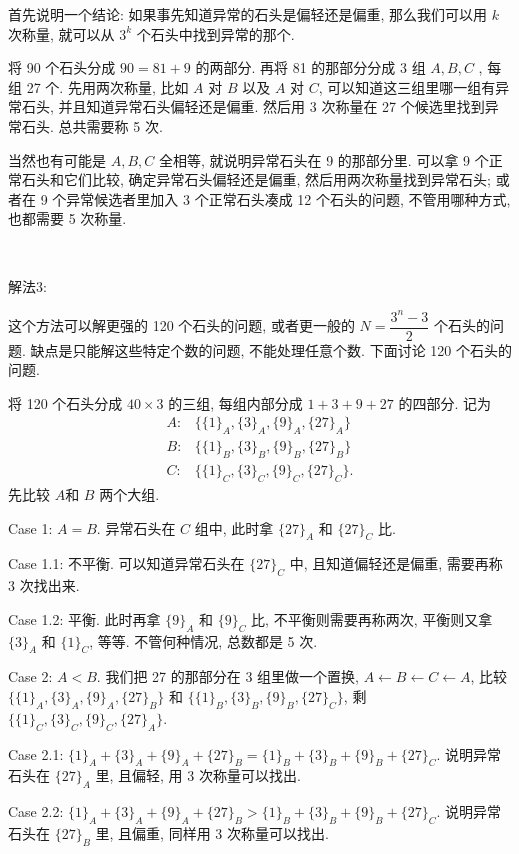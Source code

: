 首先说明一个结论: 如果事先知道异常的石头是偏轻还是偏重, 那么我们可以用 $k$ 次称量, 就可以从 $3^k$ 个石头中找到异常的那个.

将 90 个石头分成 $ 90 = 81 + 9 $ 的两部分. 再将 81 的那部分分成 3 组 $ A,B,C$ , 每组 27 个. 先用两次称量, 比如 $A$ 对 $B$ 以及 $A$ 对 $C$, 可以知道这三组里哪一组有异常石头, 并且知道异常石头偏轻还是偏重. 然后用 3 次称量在 27 个候选里找到异常石头. 总共需要称 5 次.

当然也有可能是 $ A, B, C $ 全相等, 就说明异常石头在 9 的那部分里. 可以拿 9 个正常石头和它们比较, 确定异常石头偏轻还是偏重, 然后用两次称量找到异常石头; 或者在 9 个异常候选者里加入 3 个正常石头凑成 12 个石头的问题, 不管用哪种方式, 也都需要 5 次称量.

~

\noindent 解法3:

这个方法可以解更强的 120 个石头的问题, 或者更一般的 $N = \dfrac{3^n - 3}{2}$ 个石头的问题. 缺点是只能解这些特定个数的问题, 不能处理任意个数. 下面讨论 120 个石头的问题.

将 120 个石头分成 $ 40\times 3 $ 的三组, 每组内部分成 $ 1 + 3 + 9 + 27 $ 的四部分. 记为 
\begin{align*} 
A: &\{\{1\}_A, \{3\}_A, \{9\}_A, \{27\}_A \} \\ 
B: &\{\{1\}_B, \{3\}_B, \{9\}_B, \{27\}_B \} \\
C: &\{\{1\}_C, \{3\}_C, \{9\}_C, \{27\}_C \} . 
\end{align*}
先比较 $A$和 $B$ 两个大组.

Case 1: $ A = B $. 异常石头在 $ C $ 组中, 此时拿 $ \{27\}_A $ 和 $ \{27\}_C $ 比. 

Case 1.1: 不平衡. 可以知道异常石头在 $ \{27\}_C $ 中, 且知道偏轻还是偏重, 需要再称 3 次找出来.

Case 1.2: 平衡. 此时再拿 $ \{9\}_A $ 和 $ \{9\}_C $ 比, 不平衡则需要再称两次, 平衡则又拿 $ \{3\}_A $ 和 $ \{1\}_C $, 等等. 不管何种情况, 总数都是 5 次.

Case 2: $ A < B $. 我们把 27 的那部分在 3 组里做一个置换, $A\leftarrow B\leftarrow C\leftarrow A$, 比较 $ \{\{1\}_A, \{3\}_A, \{9\}_A, \{27\}_B \} $ 和 $ \{\{1\}_B, \{3\}_B, \{9\}_B, \{27\}_C \} $, 剩 $ \{\{1\}_C, \{3\}_C, \{9\}_C, \{27\}_A \} $.

Case 2.1: $\{1\}_A + \{3\}_A + \{9\}_A + \{27\}_B = \{1\}_B + \{3\}_B + \{9\}_B + \{27\}_C $. 说明异常石头在 $\{27\}_A$ 里, 且偏轻, 用 3 次称量可以找出.

Case 2.2: $\{1\}_A + \{3\}_A + \{9\}_A + \{27\}_B > \{1\}_B + \{3\}_B + \{9\}_B + \{27\}_C $. 说明异常石头在 $\{27\}_B$ 里, 且偏重, 同样用 3 次称量可以找出.

